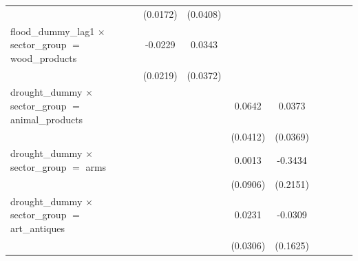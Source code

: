 \begin{tabular}{lcccccccc}
                                                                                  & (0.0172)              & (0.0408)              &                       &                       &                       &                       &                       &   \\   
   flood\_dummy\_lag1 $\times$ sector\_group $=$ wood\_products                   & -0.0229               & 0.0343                &                       &                       &                       &                       &                       &   \\   
                                                                                  & (0.0219)              & (0.0372)              &                       &                       &                       &                       &                       &   \\   
   drought\_dummy $\times$ sector\_group $=$ animal\_products                     &                       &                       & 0.0642                & 0.0373                &                       &                       &                       &   \\   
                                                                                  &                       &                       & (0.0412)              & (0.0369)              &                       &                       &                       &   \\   
   drought\_dummy $\times$ sector\_group $=$ arms                                 &                       &                       & 0.0013                & -0.3434               &                       &                       &                       &   \\   
                                                                                  &                       &                       & (0.0906)              & (0.2151)              &                       &                       &                       &   \\   
   drought\_dummy $\times$ sector\_group $=$ art\_antiques                        &                       &                       & 0.0231                & -0.0309               &                       &                       &                       &   \\   
                                                                                  &                       &                       & (0.0306)              & (0.1625)              &                       &                       &                       &   \\   

\end{tabular}
